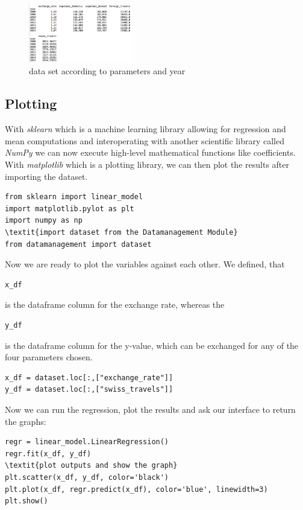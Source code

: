 \documentclass[12pt,a4paper,bibliography=totocnumbered,listof=totocnumbered]{scrartcl}
\begin{document}
\begin{figure}[htbp] 
  \centering
     \includegraphics[width=0.4\textwidth]{data_table}
  \caption{data set according to parameters and year }
  \label{fig: figure2}
\end{figure}


\subsection{Plotting}
With \textit{sklearn} which is a machine learning library allowing for regression and mean computations and interoperating with another scientific library called \textit{NumPy} we can now execute high-level mathematical functions like coefficients. With \textit{matplotlib} which is a plotting library, we can then plot the results after importing the dataset. 

\begin{verbatim}
from sklearn import linear_model
import matplotlib.pylot as plt
import numpy as np
\textit{import dataset from the Datamanagement Module}
from datamanagement import dataset
\end{verbatim}

Now we are ready to plot the variables against each other. We defined, that \begin{verbatim}
x_df
\end{verbatim} is the dataframe column for the exchange rate, whereas the \begin{verbatim}
y_df
\end{verbatim} is the dataframe column for the y-value, which can be exchanged for any of the four parameters chosen. 
\begin{verbatim}
x_df = dataset.loc[:,["exchange_rate"]]
y_df = dataset.loc[:,["swiss_travels"]]
\end{verbatim}


Now we can run the regression, plot the results and ask our interface to return the graphs:
\begin{verbatim}
regr = linear_model.LinearRegression()
regr.fit(x_df, y_df)
\textit{plot outputs and show the graph}
plt.scatter(x_df, y_df, color='black')
plt.plot(x_df, regr.predict(x_df), color='blue', linewidth=3)
plt.show()
\end{verbatim}
\end{document}
